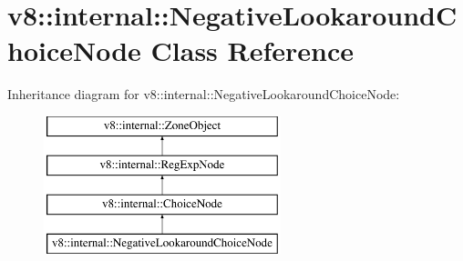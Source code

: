 \hypertarget{classv8_1_1internal_1_1NegativeLookaroundChoiceNode}{}\section{v8\+:\+:internal\+:\+:Negative\+Lookaround\+Choice\+Node Class Reference}
\label{classv8_1_1internal_1_1NegativeLookaroundChoiceNode}
Inheritance diagram for v8\+:\+:internal\+:\+:Negative\+Lookaround\+Choice\+Node\+:\begin{figure}[H]
\begin{center}
\leavevmode
\includegraphics[height=4.000000cm]{classv8_1_1internal_1_1NegativeLookaroundChoiceNode}
\end{center}
\end{figure}
